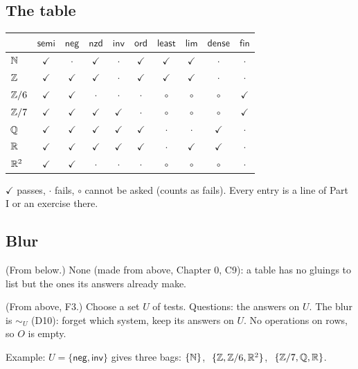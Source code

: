 \subsection*{The table}

\begin{center}
\renewcommand{\arraystretch}{1.3}
\begin{tabular}{l|ccccccccc}
 & $\mathsf{semi}$ & $\mathsf{neg}$ & $\mathsf{nzd}$ & $\mathsf{inv}$ & $\mathsf{ord}$ & $\mathsf{least}$ & $\mathsf{lim}$ & $\mathsf{dense}$ & $\mathsf{fin}$ \\ \hline
$\mathbb{N}$   & $\checkmark$ & $\cdot$ & $\checkmark$ & $\cdot$ & $\checkmark$ & $\checkmark$ & $\checkmark$ & $\cdot$ & $\cdot$ \\
$\mathbb{Z}$   & $\checkmark$ & $\checkmark$ & $\checkmark$ & $\cdot$ & $\checkmark$ & $\checkmark$ & $\checkmark$ & $\cdot$ & $\cdot$ \\
$\mathbb{Z}/6$ & $\checkmark$ & $\checkmark$ & $\cdot$ & $\cdot$ & $\cdot$ & $\circ$ & $\circ$ & $\circ$ & $\checkmark$ \\
$\mathbb{Z}/7$ & $\checkmark$ & $\checkmark$ & $\checkmark$ & $\checkmark$ & $\cdot$ & $\circ$ & $\circ$ & $\circ$ & $\checkmark$ \\
$\mathbb{Q}$   & $\checkmark$ & $\checkmark$ & $\checkmark$ & $\checkmark$ & $\checkmark$ & $\cdot$ & $\cdot$ & $\checkmark$ & $\cdot$ \\
$\mathbb{R}$   & $\checkmark$ & $\checkmark$ & $\checkmark$ & $\checkmark$ & $\checkmark$ & $\cdot$ & $\checkmark$ & $\checkmark$ & $\cdot$ \\
$\mathbb{R}^2$ & $\checkmark$ & $\checkmark$ & $\cdot$ & $\cdot$ & $\cdot$ & $\circ$ & $\circ$ & $\circ$ & $\cdot$ \\
\end{tabular}
\end{center}
$\checkmark$ passes, $\cdot$ fails, $\circ$ cannot be asked (counts as fails). Every entry is a line of Part I or an exercise there.

\subsection*{Blur}

\begin{lines}
\item[\lab{B1}] (From below.) None (made from above, Chapter 0, C9): a table has no gluings to list but the ones its answers already make.
\item[\lab{B2}] (From above, F3.) Choose a set $U$ of tests. Questions: the answers on $U$. The blur is $\sim_U$ (D10): forget which system, keep its answers on $U$. No operations on rows, so $O$ is empty.
\item[] Example: $U = \{\mathsf{neg}, \mathsf{inv}\}$ gives three bags: $\{\mathbb{N}\}$, $\ \{\mathbb{Z}, \mathbb{Z}/6, \mathbb{R}^2\}$, $\ \{\mathbb{Z}/7, \mathbb{Q}, \mathbb{R}\}$.
\end{lines}

